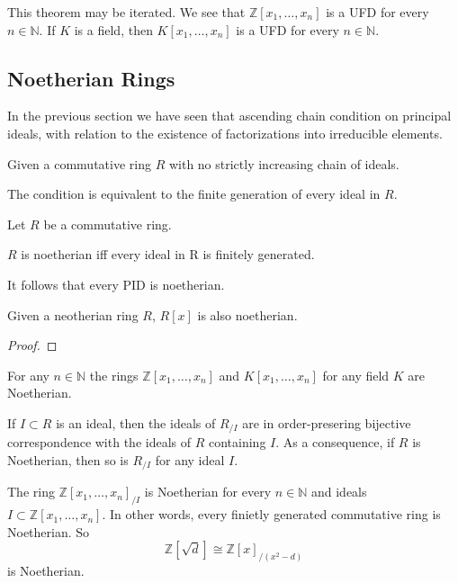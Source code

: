 \begin{remark}
   This theorem may be iterated.
   We see that \(\mathbb{Z}[x_1, \ldots, x_n]\) is a UFD for every \(n \in \mathbb{N}\).
   If \(K\) is a field, then \(K[x_1, \ldots, x_n]\) is a UFD for every \(n \in \mathbb{N}\).
\end{remark}

\subsection{Noetherian Rings}
In the previous section we have seen that ascending chain condition on principal ideals, with relation to the existence of factorizations into irreducible elements.
\begin{definition}
   Given a commutative ring \(R\) with no strictly increasing chain of ideals.
\end{definition}
\begin{remark}
   The condition is equivalent to the finite generation of every ideal in \(R\).
\end{remark}

\begin{proposition}
   Let \(R\) be a commutative ring.

   \(R\) is noetherian iff every ideal in R is finitely generated.
\end{proposition}
\begin{remark}
   It follows that every PID is noetherian.
\end{remark}

\begin{theorem}
   Given a neotherian ring \(R\), \(R[x]\) is also noetherian.
\end{theorem}
\begin{proof}
\end{proof}
\begin{example}
   For any \(n \in \mathbb{N}\) the rings \(\mathbb{Z}[x_1, \ldots, x_n]\) and \(K[x_1, \ldots, x_n]\) for any field \(K\) are Noetherian.
\end{example}

If \(I \subset R\) is an ideal, then the ideals of \(R_{/I}\) are in order-presering bijective correspondence with the ideals of \(R\) containing \(I\).
As a consequence, if \(R\) is Noetherian, then so is \(R_{/I}\) for any ideal \(I\).
\begin{example}
   The ring \(\mathbb{Z}[x_1, \ldots, x_n]_{/I}\) is Noetherian for every \(n \in \mathbb{N}\) and ideals \(I \subset \mathbb{Z}[x_1, \ldots, x_n]\).
   In other words, every finietly generated commutative ring is Noetherian.
   So
   \[\mathbb{Z}[\sqrt{d}] \cong \mathbb{Z}[x]_{/(x^2 - d)}\]
   is Noetherian.
\end{example}

